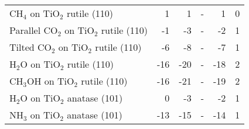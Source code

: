 \begin{table}
\begin{adjustbox}{center,max width=1\textwidth}
\begin{tabular}{lrrrrr}
CH$_4$ on TiO$_2$ rutile (110) & 1 & 1 & - & 1 & 0 \\
Parallel CO$_2$ on TiO$_2$ rutile (110) & -1 & -3 & - & -2 & 1 \\
Tilted CO$_2$ on TiO$_2$ rutile (110) & -6 & -8 & - & -7 & 1 \\
H$_2$O on TiO$_2$ rutile (110) & -16 & -20 & - & -18 & 2 \\
CH$_3$OH on TiO$_2$ rutile (110) & -16 & -21 & - & -19 & 2 \\
H$_2$O on TiO$_2$ anatase (101) & 0 & -3 & - & -2 & 1 \\
NH$_3$ on TiO$_2$ anatase (101) & -13 & -15 & - & -14 & 1 \\
\bottomrule
\end{tabular}
\end{adjustbox}
\end{table}